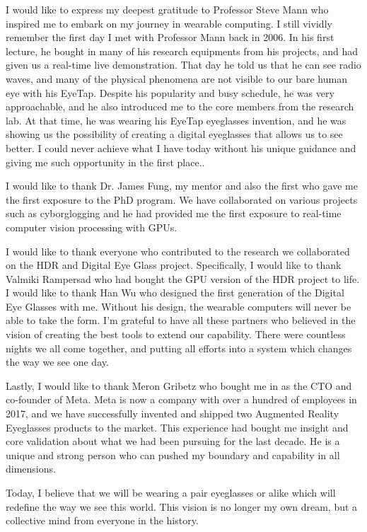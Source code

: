 I would like to express my deepest gratitude to Professor Steve Mann who inspired me to embark on my journey in wearable computing. I still vividly remember the first day I met with Professor Mann back in 2006. In his first lecture, he bought in many of his research equipments from his projects, and had given us a real-time live demonstration. That day he told us that he can see radio waves, and many of the physical phenomena are not visible to our bare human eye with his EyeTap. Despite his popularity and busy schedule, he was very approachable, and he also introduced me to the core members from the research lab. At that time, he was wearing his EyeTap eyeglasses invention, and he was showing us the possibility of creating a digital eyeglasses that allows us to see better. I could never achieve what I have today without his unique guidance and giving me such opportunity in the first place.. 

I would like to thank Dr. James Fung, my mentor and also the first who gave me the first exposure to the PhD program. We have collaborated on various projects such as cyborglogging and he had provided me the first exposure to real-time computer vision processing with GPUs.

I would like to thank everyone who contributed to the research we collaborated on the HDR and Digital Eye Glass project. Specifically, I would like to thank Valmiki Rampersad who had bought the GPU version of the HDR project to life. I would like to thank Han Wu who designed the first generation of the Digital Eye Glasses with me. Without his design, the wearable computers will never be able to take the form. I'm grateful to have all these partners who believed in the vision of creating the best tools to extend our capability. There were countless nights we all come together, and putting all efforts into a system which changes the way we see one day.
 
Lastly, I would like to thank Meron Gribetz who bought me in as the CTO and co-founder of Meta. Meta is now a company with over a hundred of employees in 2017, and we have successfully invented and shipped two Augmented Reality Eyeglasses products to the market. This experience had bought me insight and core validation about what we had been pursuing for the last decade. He is a unique and strong person who can pushed my boundary and capability in all dimensions.

Today, I believe that we will be wearing a pair eyeglasses or alike which will redefine the way we see this world. This vision is no longer my own dream, but a collective mind from everyone in the history.